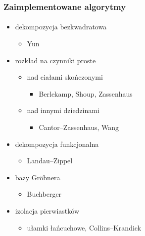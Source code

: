 \documentclass{beamer}
\begin{document}
\begin{frame}
    \frametitle{Zaimplementowane algorytmy}
    \framesubtitle{}

    \begin{itemize}
        \item dekompozycja bezkwadratowa
            \begin{itemize}
                \item Yun
            \end{itemize}
        \item rozkład na czynniki proste
            \begin{itemize}
                \item nad ciałami skończonymi
                    \begin{itemize}
                        \item Berlekamp, Shoup, Zassenhaus
                    \end{itemize}
                \item nad innymi dziedzinami
                    \begin{itemize}
                        \item Cantor--Zassenhaus, Wang
                    \end{itemize}
            \end{itemize}
        \item dekompozycja funkcjonalna
            \begin{itemize}
                \item Landau--Zippel
            \end{itemize}
        \item bazy Gr\"{o}bnera
            \begin{itemize}
                \item Buchberger
            \end{itemize}
        \item izolacja pierwiastków
            \begin{itemize}
                \item ułamki łańcuchowe, Collins--Krandick
            \end{itemize}
    \end{itemize}
\end{frame}
\end{document}
